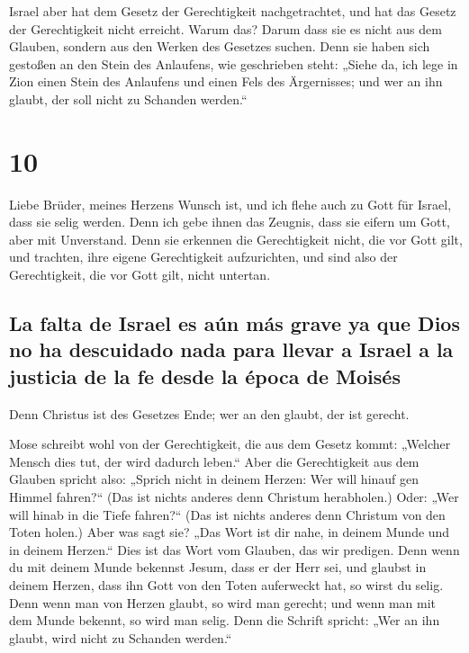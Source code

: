  Israel aber hat dem Gesetz der Gerechtigkeit
nachgetrachtet, und hat das Gesetz der Gerechtigkeit nicht erreicht.
 Warum das? Darum dass sie es nicht aus dem Glauben,
sondern aus den Werken des Gesetzes suchen. Denn sie haben sich gestoßen
an den Stein des Anlaufens,  wie geschrieben steht:
„Siehe da, ich lege in Zion einen Stein des Anlaufens und einen Fels des
Ärgernisses; und wer an ihn glaubt, der soll nicht zu Schanden werden.``

\hypertarget{section-9}{%
\section{10}\label{section-9}}

 Liebe Brüder, meines Herzens Wunsch ist, und ich flehe
auch zu Gott für Israel, dass sie selig werden.  Denn ich
gebe ihnen das Zeugnis, dass sie eifern um Gott, aber mit Unverstand.
 Denn sie erkennen die Gerechtigkeit nicht, die vor Gott
gilt, und trachten, ihre eigene Gerechtigkeit aufzurichten, und sind
also der Gerechtigkeit, die vor Gott gilt, nicht untertan.

\hypertarget{la-falta-de-israel-es-auxfan-muxe1s-grave-ya-que-dios-no-ha-descuidado-nada-para-llevar-a-israel-a-la-justicia-de-la-fe-desde-la-uxe9poca-de-moisuxe9s}{%
\subsection{La falta de Israel es aún más grave ya que Dios no ha
descuidado nada para llevar a Israel a la justicia de la fe desde la
época de
Moisés}\label{la-falta-de-israel-es-auxfan-muxe1s-grave-ya-que-dios-no-ha-descuidado-nada-para-llevar-a-israel-a-la-justicia-de-la-fe-desde-la-uxe9poca-de-moisuxe9s}}

 Denn Christus ist des Gesetzes Ende; wer an den glaubt,
der ist gerecht.

 Mose schreibt wohl von der Gerechtigkeit, die aus dem
Gesetz kommt: „Welcher Mensch dies tut, der wird dadurch leben.``
 Aber die Gerechtigkeit aus dem Glauben spricht also:
„Sprich nicht in deinem Herzen: Wer will hinauf gen Himmel fahren?{}``
(Das ist nichts anderes denn Christum herabholen.)  Oder:
„Wer will hinab in die Tiefe fahren?{}`` (Das ist nichts anderes denn
Christum von den Toten holen.)  Aber was sagt sie? „Das
Wort ist dir nahe, in deinem Munde und in deinem Herzen.`` Dies ist das
Wort vom Glauben, das wir predigen.  Denn wenn du mit
deinem Munde bekennst Jesum, dass er der Herr sei, und glaubst in deinem
Herzen, dass ihn Gott von den Toten auferweckt hat, so wirst du selig.
 Denn wenn man von Herzen glaubt, so wird man gerecht;
und wenn man mit dem Munde bekennt, so wird man selig. 
Denn die Schrift spricht: „Wer an ihn glaubt, wird nicht zu Schanden
werden.``

